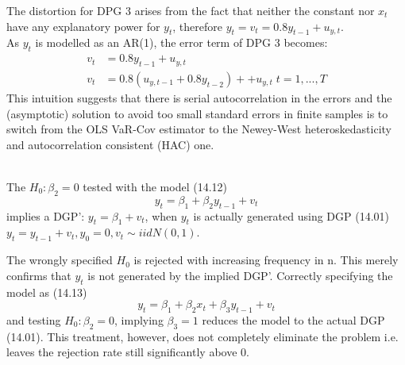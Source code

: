 \documentclass[]{article}
\newcommand{\highlightTP}[1]{\highlight[id=tp]{#1}}
\begin{document}
The distortion for DPG 3 arises from the fact that neither the constant nor $x_t$ have any explanatory power for $y_t$, therefore $y_t = v_t = 0.8y_{t-1}+u_{y,t}$.\\ As $y_t$ is modelled as an AR(1), the error term of DPG 3 becomes:
\begin{align*}
	v_t &= 0.8y_{t-1}+u_{y,t} \\
	v_t &= 0.8(u_{y,t-1} + 0.8y_{t-2}) + +u_{y,t} \; t=1,...,T
\end{align*}
This intuition suggests that there is serial autocorrelation in the errors and the (asymptotic) solution to avoid too small standard errors in finite samples is to switch from the OLS VaR-Cov estimator to the Newey-West heteroskedasticity and autocorrelation consistent (HAC) one.


\highlightTP{Text from Timo}\\
The $H_0: \beta_2=0$ tested with the model (14.12) $$y_t = \beta_1 + \beta_2y_{t-1} + v_t$$ implies a DGP': $y_t = \beta_1 + v_t$, when $y_t$ is actually generated using DGP (14.01) $y_t = y_{t-1} + v_t, y_0=0, v_t \sim iidN(0,1)$.

The wrongly specified $H_0$ is rejected with increasing frequency in n. This merely confirms that $y_t$ is not generated by the implied DGP'. Correctly specifying the model as (14.13) $$y_t = \beta_1 + \beta_2 x_t + \beta_3 y_{t-1} + v_t$$ and testing $H_0:\beta_2=0$, implying $\beta_3=1$ reduces the model to the actual DGP (14.01). This treatment, however, does not completely eliminate the problem i.e. leaves the rejection rate still significantly above 0.
\end{document}
